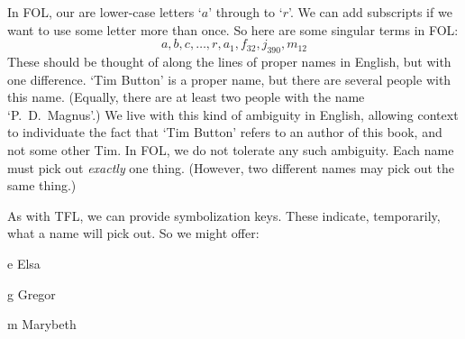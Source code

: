 In FOL, our  are lower-case letters `$a$' through to `$r$'. We can add subscripts if we want to use some letter more than once. So here are some singular terms in FOL:
	$$a,b,c,\ldots, r, a_1, f_{32}, j_{390}, m_{12}$$
These should be thought of along the lines of proper names in English, but with one difference. `Tim Button' is a proper name, but there are several people with this name. (Equally, there are  at least two people with the name `P.~D.\ Magnus'.) We live with this kind of ambiguity in English, allowing context to individuate the fact that `Tim Button' refers to an author of this book, and not some other Tim. In FOL, we do not tolerate any such ambiguity. Each name must pick out \emph{exactly} one thing. (However, two different names may pick out the same thing.)


As with TFL, we can provide symbolization keys. These indicate, temporarily, what a name will pick out. So we might offer:
	\begin{ekey}
		\item[e] Elsa
		\item[g] Gregor
		\item[m] Marybeth
	\end{ekey}


